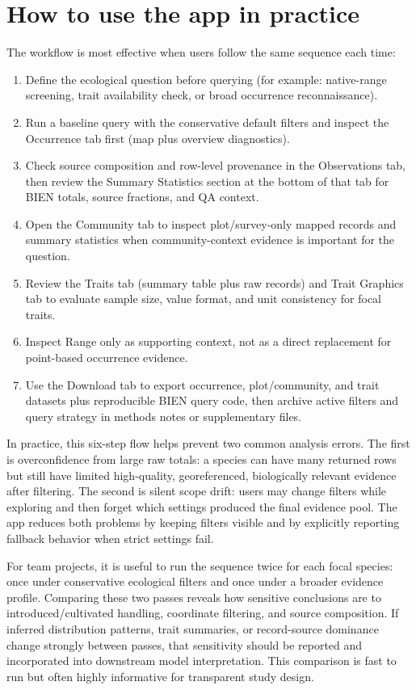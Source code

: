 \documentclass[11pt]{article}
\begin{document}
\section*{How to use the app in practice}
The workflow is most effective when users follow the same sequence each time:
\begin{enumerate}
\item Define the ecological question before querying (for example: native-range screening, trait availability check, or broad occurrence reconnaissance).
\item Run a baseline query with the conservative default filters and inspect the Occurrence tab first (map plus overview diagnostics).
\item Check source composition and row-level provenance in the Observations tab, then review the Summary Statistics section at the bottom of that tab for BIEN totals, source fractions, and QA context.
\item Open the Community tab to inspect plot/survey-only mapped records and summary statistics when community-context evidence is important for the question.
\item Review the Traits tab (summary table plus raw records) and Trait Graphics tab to evaluate sample size, value format, and unit consistency for focal traits.
\item Inspect Range only as supporting context, not as a direct replacement for point-based occurrence evidence.
\item Use the Download tab to export occurrence, plot/community, and trait datasets plus reproducible BIEN query code, then archive active filters and query strategy in methods notes or supplementary files.
\end{enumerate}

In practice, this six-step flow helps prevent two common analysis errors. The first is overconfidence from large raw totals: a species can have many returned rows but still have limited high-quality, georeferenced, biologically relevant evidence after filtering. The second is silent scope drift: users may change filters while exploring and then forget which settings produced the final evidence pool. The app reduces both problems by keeping filters visible and by explicitly reporting fallback behavior when strict settings fail.

For team projects, it is useful to run the sequence twice for each focal species: once under conservative ecological filters and once under a broader evidence profile. Comparing these two passes reveals how sensitive conclusions are to introduced/cultivated handling, coordinate filtering, and source composition. If inferred distribution patterns, trait summaries, or record-source dominance change strongly between passes, that sensitivity should be reported and incorporated into downstream model interpretation. This comparison is fast to run but often highly informative for transparent study design.
\end{document}
